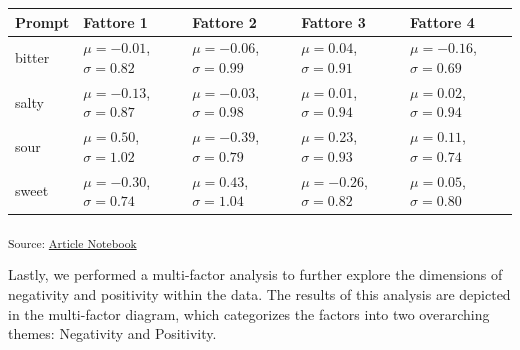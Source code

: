 \documentclass[
  letterpaper,
  DIV=11,
  numbers=noendperiod]{scrartcl}
\begin{document}
\begin{longtable}[]{@{}
  >{\raggedright\arraybackslash}p{}
  >{\raggedright\arraybackslash}p{}
  >{\raggedright\arraybackslash}p{}
  >{\raggedright\arraybackslash}p{}
  >{\raggedright\arraybackslash}p{}@{}}
\toprule\noalign{}
\begin{minipage}[b]{\linewidth}\raggedright
Prompt
\end{minipage} & \begin{minipage}[b]{\linewidth}\raggedright
Fattore 1
\end{minipage} & \begin{minipage}[b]{\linewidth}\raggedright
Fattore 2
\end{minipage} & \begin{minipage}[b]{\linewidth}\raggedright
Fattore 3
\end{minipage} & \begin{minipage}[b]{\linewidth}\raggedright
Fattore 4
\end{minipage} \\
\midrule\noalign{}
\endhead
\bottomrule\noalign{}
\endlastfoot
bitter & \(\mu=-0.01\), \(\sigma=0.82\) & \(\mu=-0.06\), \(\sigma=0.99\)
& \(\mu=0.04\), \(\sigma=0.91\) & \(\mu=-0.16\), \(\sigma=0.69\) \\
salty & \(\mu=-0.13\), \(\sigma=0.87\) & \(\mu=-0.03\), \(\sigma=0.98\)
& \(\mu=0.01\), \(\sigma=0.94\) & \(\mu=0.02\), \(\sigma=0.94\) \\
sour & \(\mu=0.50\), \(\sigma=1.02\) & \(\mu=-0.39\), \(\sigma=0.79\) &
\(\mu=0.23\), \(\sigma=0.93\) & \(\mu=0.11\), \(\sigma=0.74\) \\
sweet & \(\mu=-0.30\), \(\sigma=0.74\) & \(\mu=0.43\), \(\sigma=1.04\) &
\(\mu=-0.26\), \(\sigma=0.82\) & \(\mu=0.05\), \(\sigma=0.80\) \\
\end{longtable}

\textsubscript{Source:
\href{https://matteospanio.github.io/multimodal-symphony-survey-analysis/index.qmd.html}{Article
Notebook}}

Lastly, we performed a multi-factor analysis to further explore the
dimensions of negativity and positivity within the data. The results of
this analysis are depicted in the multi-factor diagram, which
categorizes the factors into two overarching themes: Negativity and
Positivity.
\end{document}
